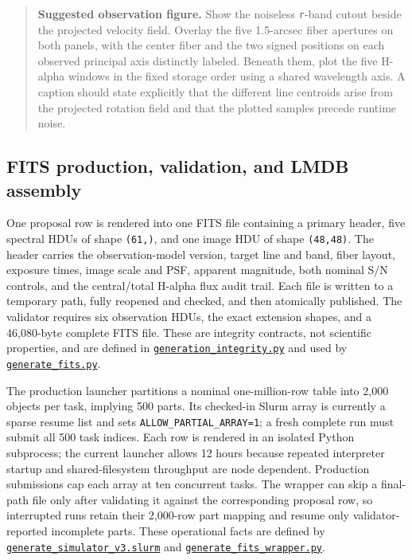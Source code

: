 \documentclass[11pt]{article}
\newcommand{\code}[1]{\nolinkurl{#1}}
\begin{document}
\begin{quote}
\small
\textbf{Suggested observation figure.} Show the noiseless \code{r}-band cutout beside
the projected velocity field. Overlay the five 1.5-arcsec fiber apertures on
both panels, with the center fiber and the two signed positions on each
observed principal axis distinctly labeled. Beneath them, plot the five
H-alpha windows in the fixed storage order using a shared wavelength axis.
A caption should state explicitly that the different line centroids arise
from the projected rotation field and that the plotted samples precede
runtime noise.
\end{quote}

\subsection{FITS production, validation, and LMDB assembly}

One proposal row is rendered into one FITS file containing a primary header,
five spectral HDUs of shape \code{(61,)}, and one image HDU of shape \code{(48,48)}.
The header carries the observation-model version, target line and band, fiber
layout, exposure times, image scale and PSF, apparent magnitude, both nominal
S/N controls, and the central/total H-alpha flux audit trail. Each file is
written to a temporary path, fully reopened and checked, and then atomically
published. The validator requires six observation HDUs, the exact extension
shapes, and a 46,080-byte complete FITS file. These are integrity contracts,
not scientific properties, and are defined in
\href{../data_generate/generation_integrity.py}{\code{generation_integrity.py}} and used
by \href{../data_generate/generate_fits.py}{\code{generate_fits.py}}.

The production launcher partitions a nominal one-million-row table into 2,000
objects per task, implying 500 parts. Its checked-in Slurm array is currently a
sparse resume list and sets \code{ALLOW_PARTIAL_ARRAY=1}; a fresh complete run must
submit all 500 task indices. Each row is rendered in an isolated Python
subprocess; the current launcher allows 12 hours because repeated interpreter
startup and shared-filesystem throughput are node dependent. Production
submissions cap each array at ten concurrent tasks. The wrapper can skip a
final-path file only after validating it against the corresponding proposal
row, so interrupted runs retain their 2,000-row part mapping and resume only
validator-reported incomplete parts. These operational facts are defined by
\href{../data_generate/generate_simulator_v3.slurm}{\code{generate_simulator_v3.slurm}}
and \href{../data_generate/generate_fits_wrapper.py}{\code{generate_fits_wrapper.py}}.
\end{document}
